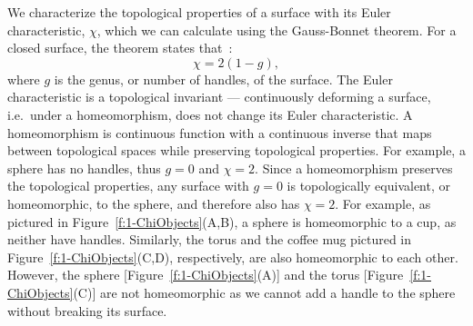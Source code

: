 We characterize the topological properties of a surface with its Euler characteristic, $\chi$, which we can calculate using the Gauss-Bonnet theorem.
For a closed surface, the theorem states that~\cite{RN23}:
\begin{equation}
  \chi = 2(1-g),\label{e:1-GB1}
\end{equation}
where $g$ is the genus, or number of handles, of the surface.
The Euler characteristic is a topological invariant --- continuously deforming a surface, i.e.\ under a homeomorphism, does not change its Euler characteristic.
A homeomorphism is continuous function with a continuous inverse that maps between topological spaces while preserving topological properties.
For example, a sphere has no handles, thus $g = 0$ and $\chi=2$.
Since a homeomorphism preserves the topological properties, any surface with $g=0$ is topologically equivalent, or homeomorphic, to the sphere, and therefore also has $\chi=2$.
For example, as pictured in Figure~\ref{f:1-ChiObjects}(A,B), a sphere is homeomorphic to a cup, as neither have handles.
Similarly, the torus and the coffee mug pictured in Figure~\ref{f:1-ChiObjects}(C,D), respectively, are also homeomorphic to each other.
However, the sphere [Figure~\ref{f:1-ChiObjects}(A)] and the torus [Figure~\ref{f:1-ChiObjects}(C)] are not homeomorphic as we cannot add a handle to the sphere without breaking its surface.

